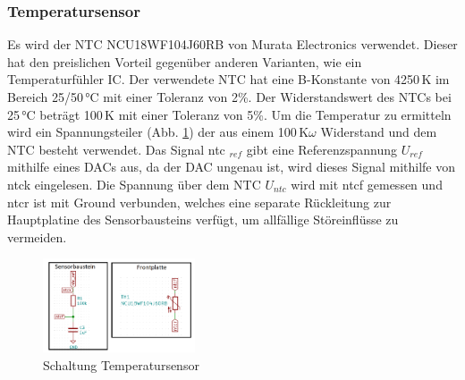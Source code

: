 \subsubsection{Temperatursensor} \label{Temperatursensor}
Es wird der NTC NCU18WF104J60RB von Murata Electronics verwendet. Dieser hat den preislichen Vorteil gegenüber anderen Varianten, wie ein Temperaturfühler IC. Der verwendete NTC hat eine B-Konstante von 4250\,K im Bereich 25/50\,°C mit einer Toleranz von 2\%. Der Widerstandswert des NTCs bei 25\,°C beträgt 100\,K mit einer Toleranz von 5\%. Um die Temperatur zu ermitteln wird ein Spannungsteiler (Abb. \ref{pic: Temperatursensor}) der aus einem 100\,K$\omega$ Widerstand und dem NTC besteht verwendet. Das Signal ntc $_{ref}$ gibt eine Referenzspannung $U_{ref}$ mithilfe eines DACs aus, da der DAC ungenau ist, wird dieses Signal mithilfe von ntck eingelesen. Die Spannung über dem NTC $U_{ntc}$ wird mit ntcf gemessen und ntcr ist mit Ground verbunden, welches eine separate Rückleitung zur Hauptplatine des Sensorbausteins verfügt, um allfällige Störeinflüsse zu vermeiden.

\begin{figure}[h!]
	\centering
	\includegraphics[width=0.4\textwidth]{graphics/shematics_sensor_Temp.png}
	\caption{Schaltung Temperatursensor}
	\label{pic: Temperatursensor}
\end{figure}

